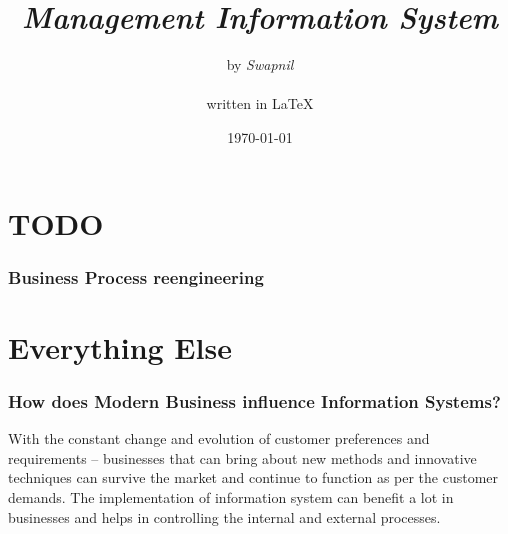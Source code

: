 \documentclass[a4paper]{article}
\title{\Huge{\emph{Management Information System}
  }
  }
\author{\huge{by \emph{Swapnil}}\\ \\ \Large{written in {\LaTeX}}
  }
\date{\today}
\begin{document}
  \maketitle
  \thispagestyle{empty}

  \setcounter{tocdepth}{3}
  \tableofcontents
  \newpage

\part{TODO}
\section{Business Process reengineering}

\part{Everything Else}
\section{How does Modern Business influence Information Systems?}
With the constant change and evolution of customer preferences and requirements
– businesses that can bring about new methods and innovative techniques can
survive the market and continue to function as per the customer demands. The
implementation of information system can benefit a lot in businesses and helps
in controlling the internal and external processes.
\end{document}
